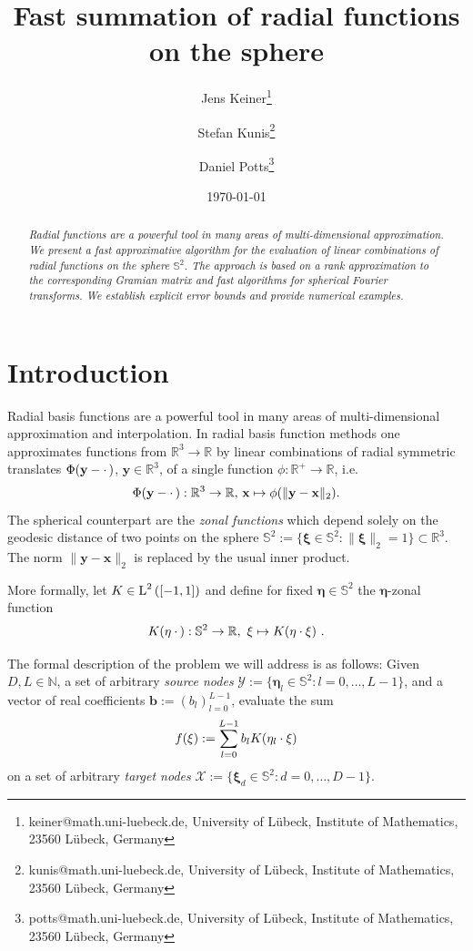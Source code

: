 \documentclass[11pt,a4paper,twoside,bibtotoc]{scrartcl}
\title{Fast summation of radial functions on the sphere}
\date{\today}
\author{
Jens Keiner\thanks{keiner@math.uni-luebeck.de, University of
  L\"ubeck, Institute of Mathematics, 23560 L\"ubeck, Germany} \and
Stefan Kunis\thanks{kunis@math.uni-luebeck.de, University of
  L\"ubeck, Institute of Mathematics, 23560 L\"ubeck, Germany} \and
Daniel Potts\thanks{potts@math.uni-luebeck.de, University of
  L\"ubeck, Institute of Mathematics, 23560 L\"ubeck, Germany} 
}
\theoremstyle{plain}
\theoremstyle{definition}
\theoremstyle{remark}
\newcommand{\N}{\ensuremath{\mathbb{N}}}
\newcommand{\R}{\ensuremath{\mathbb{R}}}
\newcommand{\Ln}[2]{\ensuremath{\text{\rm{L}}^{#1}\left(#2\right)}}
\newcommand{\fun}[2]{\ensuremath{#1{\hspace{-0.4ex}}\left(#2\right)}}
\numberwithin{equation}{section}
\numberwithin{table}{section}
\numberwithin{figure}{section}
\begin{document}
\maketitle

\begin{abstract}
\medskip
\noindent
{\it Radial functions are a powerful tool in many areas of multi-dimensional 
approximation. We present a fast approximative algorithm for the evaluation of
linear combinations of radial functions on the sphere $\mathbb{S}^2$. The 
approach is based on a rank approximation to the corresponding Gramian matrix
and fast algorithms for spherical Fourier transforms. We establish explicit error 
bounds and provide numerical examples.}
\end{abstract}

\section{Introduction}\label{sect:1}
Radial basis functions are a powerful tool in many areas of multi-dimensional 
approximation and interpolation.
In radial basis function methods one approximates functions from $\R^3
\rightarrow \R$ by linear combinations of radial symmetric translates 
$\fun{\Phi}{\mathbf{y} - \cdot \,}$, $\mathbf{y} \in \R^3$, of a single function $\phi : \R^{+} \rightarrow \R$, i.e. 
\[
  \fun{\Phi}{\mathbf{y} - \cdot \,}:\R^3 \rightarrow \R, \, \mathbf{x} \mapsto \phi(\|\mathbf{y} - \mathbf{x}\|_2).
\]
The spherical counterpart are the \emph{zonal functions} which depend solely
on the geodesic distance of two points on the sphere $\mathbb{S}^2:=\{
\mathbf{\xi} \in \mathbb{S}^2: \|\mathbf{\xi}\|_2=1\} \subset \R^3$. The norm $\|\mathbf{y} - \mathbf{x}\|_2$ 
is replaced by the usual inner product.

More formally, let $K \in \Ln{2}{[-1,1]}$ and define for fixed
$\mathbf{\eta} \in \mathbb{S}^2$ the $\mathbf{\eta}$-zonal function 
\[
  \fun{K}{\mathbf{\eta} \: \cdot \,}: \mathbb{S}^2 \rightarrow \R,\ \mathbf{\xi} \mapsto
  \fun{K}{\mathbf{\eta} \cdot \mathbf{\xi}}\,.%
\]

The formal description of the problem we will address is as follows:
Given $D,L \in \N$, a set of arbitrary \emph{source nodes} $\mathcal{Y} :=
\{\mathbf{\eta}_{l} \in \mathbb{S}^2: l = 0,\ldots,L-1\}$, and a vector of
real coefficients $\mathbf{b}:=(b_{l})_{l=0}^{L-1}$, evaluate the sum
\begin{equation}
  \label{Applications:KernelSum}
  \fun{f}{\mathbf{\xi}} := \sum_{l = 0}^{L-1} b_{l} \fun{K}{\mathbf{\eta}_{l} \cdot \mathbf{\xi}}
\end{equation}
on a set of arbitrary \emph{target nodes} $\mathcal{X} := \{\mathbf{\xi}_{d}
  \in \mathbb{S}^2: d=0,\ldots,D-1\}$.
\end{document}
